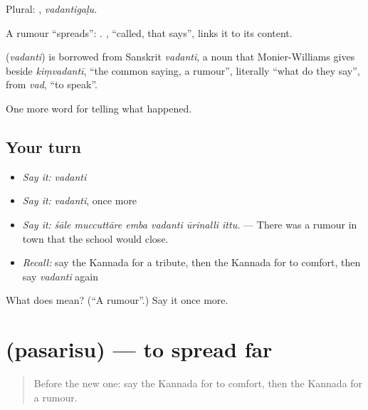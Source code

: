 Plural: , \emph{vadantigaḷu}.

A rumour \textquotedblleft{}spreads\textquotedblright{}:  . , \textquotedblleft{}called, that says\textquotedblright{}, links it to its content.

\begin{cousinweb}
\textbf{} (\emph{vadanti}) is borrowed from Sanskrit \emph{vadanti}, a noun that Monier-Williams gives beside \emph{kiṃvadantī}, \textquotedblleft{}the common saying, a rumour\textquotedblright{}, literally \textquotedblleft{}what do they say\textquotedblright{}, from \emph{vad}, \textquotedblleft{}to speak\textquotedblright{}.
\end{cousinweb}

\begin{grammarlens}[title={What you've built}]
One more word for telling what happened.
\end{grammarlens}

\subsection*{Your turn}
\begin{itemize}
\raggedright
  \item \emph{Say it:} \emph{vadanti}
  \item \emph{Say it:} \emph{vadanti}, once more
  \item \emph{Say it:} \emph{śāle muccuttāre emba vadanti ūrinalli ittu.} — There was a rumour in town that the school would close.
  \item \emph{Recall:} say the Kannada for a tribute, then the Kannada for to comfort, then say \emph{vadanti} again
\end{itemize}

\begin{tcolorbox}[breakable,colback=teal!4,colframe=teal!35!black,title={Before you move on}]
What does  mean? (\textquotedblleft{}A rumour\textquotedblright{}.) Say it once more.
\end{tcolorbox}
\section[\texorpdfstring{\kn{ಪಸರಿಸು} (pasarisu)}{ಪಸರಿಸು (pasarisu)}]{ (pasarisu) — to spread far}

\label{lesson:KA-C338-pasarisu}



\begin{quote}
Before the new one: say the Kannada for to comfort, then the Kannada for a rumour.
\end{quote}

